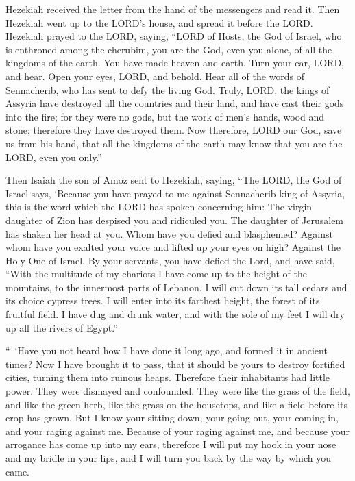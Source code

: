 \myverse{}Hezekiah received the letter from the hand of the messengers
and read it. Then Hezekiah went up to the LORD’s house, and spread it before the LORD.
\myverse{}Hezekiah prayed to the LORD, saying,
\myverse{}“LORD of Hosts, the God of Israel, who is enthroned among the cherubim, you
are the God, even you alone, of all the kingdoms of the earth. You have made heaven and earth.
\myverse{}Turn your ear, LORD, and hear. Open your eyes, LORD, and behold. Hear all
of the words of Sennacherib, who has sent to defy the living God.
\myverse{}Truly, LORD, the kings of Assyria have destroyed all the countries and their
land,
\myverse{}and have cast their gods into the fire; for they were no gods, but the work
of men’s hands, wood and stone; therefore they have destroyed them.
\myverse{}Now therefore, LORD our God, save us from his hand, that all the kingdoms
of the earth may know that you are the LORD, even you only.”

\myverse{}Then Isaiah the son of Amoz sent to Hezekiah, saying, “The LORD,
the God of Israel says, ‘Because you have prayed to me against Sennacherib king of Assyria,
\myverse{}this is the word which the LORD has spoken concerning him: The virgin daughter
of Zion has despised you and ridiculed you. The daughter of Jerusalem has shaken her head at you.
\myverse{}Whom have you defied and blasphemed? Against whom have you exalted your voice
and lifted up your eyes on high? Against the Holy One of Israel.
\myverse{}By your servants, you have defied the Lord, and have said, “With the multitude
of my chariots I have come up to the height of the mountains, to the innermost parts of Lebanon. I will
cut down its tall cedars and its choice cypress trees. I will enter into its farthest height, the forest
of its fruitful field.
\myverse{}I have dug and drunk water, and with the sole of my feet I will dry up all
the rivers of Egypt.”

\myverse{}“ ‘Have you not heard how I have done it long ago, and formed
it in ancient times? Now I have brought it to pass, that it should be yours to destroy fortified cities,
turning them into ruinous heaps.
\myverse{}Therefore their inhabitants had little power. They were dismayed and confounded.
They were like the grass of the field, and like the green herb, like the grass on the housetops, and like
a field before its crop has grown.
\myverse{}But I know your sitting down, your going out, your coming in, and your raging
against me.
\myverse{}Because of your raging against me, and because your arrogance has come up
into my ears, therefore I will put my hook in your nose and my bridle in your lips, and I will turn you
back by the way by which you came.

